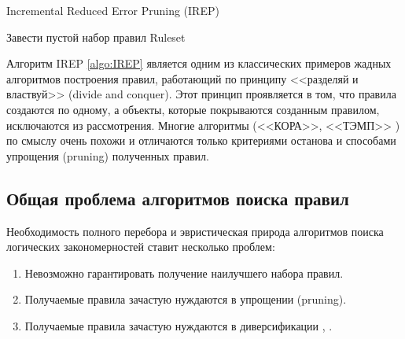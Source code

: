 \documentclass[12pt]{article}
\begin{document}
\begin{algorithm}
  \caption{Incremental Reduced Error Pruning (IREP)}\label{algo:IREP}
   {
    Завести пустой набор правил Ruleset\;
    \;
  }
\end{algorithm}

Алгоритм IREP \ref{algo:IREP} является одним из классических примеров
жадных алгоритмов построения правил, работающий по принципу <<разделяй
и властвуй>> (divide and conquer). Этот принцип проявляется в том, что
правила создаются по одному, а объекты, которые покрываются созданным
правилом, исключаются из рассмотрения. Многие алгоритмы (<<КОРА>>,
<<ТЭМП>> \cite{voron10logicalgs}) по смыслу очень похожи и отличаются
только критериями останова и способами упрощения (pruning) полученных
правил.

\subsection{Общая проблема алгоритмов поиска правил}

Необходимость полного перебора и эвристическая природа алгоритмов
поиска логических закономерностей ставит несколько проблем:

\begin{enumerate}
\item Невозможно гарантировать получение наилучшего набора правил.
\item Получаемые правила зачастую нуждаются в упрощении (pruning).
\item Получаемые правила зачастую нуждаются в диверсификации
  \cite{voron10logicalgs}, \cite{vainzvaig75voting}.
\end{enumerate}
\end{document}
